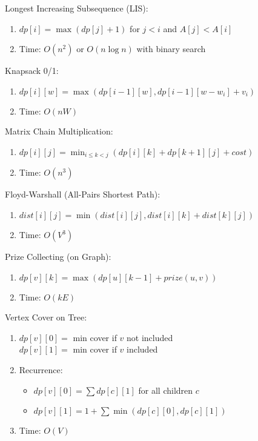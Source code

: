 \documentclass[12pt, a4paper]{article}
\begin{document}
\begin{multicols*}{3}
Longest Increasing Subsequence (LIS):
\begin{enumerate}[\roman*.]
  \item $dp[i] = \max(dp[j] + 1)$ for $j < i$ and $A[j] < A[i]$
  \item Time: $O(n^2)$ or $O(n \log n)$ with binary search
\end{enumerate}

Knapsack 0/1:
\begin{enumerate}[\roman*.]
  \item $dp[i][w] = \max(dp[i-1][w], dp[i-1][w-w_i] + v_i)$
  \item Time: $O(nW)$
\end{enumerate}

Matrix Chain Multiplication:
\begin{enumerate}[\roman*.]
  \item $dp[i][j] = \min_{i \leq k < j}(dp[i][k] + dp[k+1][j] + cost)$
  \item Time: $O(n^3)$
\end{enumerate}

Floyd-Warshall (All-Pairs Shortest Path):
\begin{enumerate}[\roman*.]
  \item $dist[i][j] = \min(dist[i][j], dist[i][k] + dist[k][j])$
  \item Time: $O(V^3)$
\end{enumerate}

Prize Collecting (on Graph):
\begin{enumerate}[\roman*.]
  \item $dp[v][k] = \max(dp[u][k-1] + prize(u,v))$
  \item Time: $O(kE)$
\end{enumerate}

Vertex Cover on Tree:
\begin{enumerate}[\roman*.]
  \item $dp[v][0] =$ min cover if $v$ not included\\
        $dp[v][1] =$ min cover if $v$ included
  \item Recurrence:
    \begin{itemize}
      \item $dp[v][0] = \sum dp[c][1]$ for all children $c$
      \item $dp[v][1] = 1 + \sum \min(dp[c][0], dp[c][1])$
    \end{itemize}
  \item Time: $O(V)$
\end{enumerate}

\end{multicols*}
\end{document}

